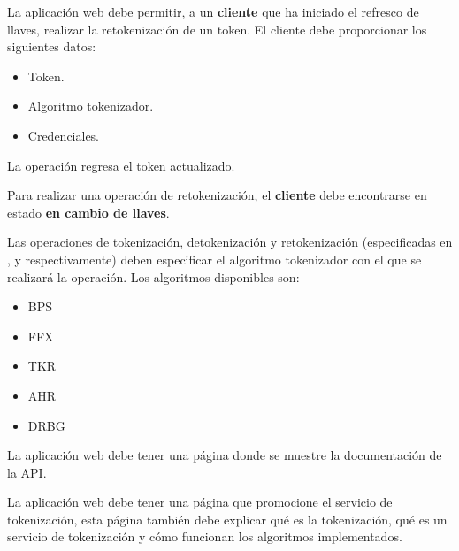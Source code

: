 {
  La aplicación web debe permitir, a un \textbf{cliente} que ha iniciado el
  refresco de llaves, realizar la retokenización de un token. El cliente debe
  proporcionar los siguientes datos:
  \begin{itemize}
    \item Token.
    \item Algoritmo tokenizador.
    \item Credenciales.
  \end{itemize}
  La operación regresa el token actualizado.

  {
    Para realizar una operación de retokenización, el \textbf{cliente} debe
    encontrarse en estado \textbf{en cambio de llaves}.
  }
}

{
  Las operaciones de tokenización, detokenización y retokenización
  (especificadas en ,
   y 
  respectivamente) deben especificar el algoritmo tokenizador con el que se
  realizará la operación. Los algoritmos disponibles son:
  \begin{itemize}
    \item BPS
    \item FFX
    \item TKR
    \item AHR
    \item DRBG
  \end{itemize}
}

{
  La aplicación web debe tener una página donde se muestre la documentación de
  la API.
}

{
  La aplicación web debe tener una página que promocione el servicio de
  tokenización, esta página también debe explicar qué es la tokenización, qué es
  un servicio de tokenización y cómo funcionan los algoritmos implementados.
}
